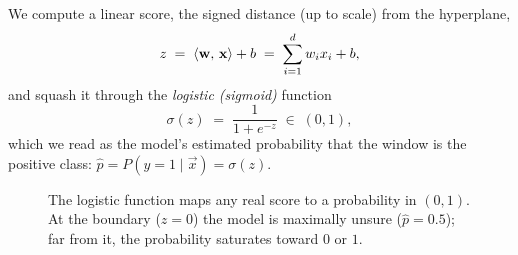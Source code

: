 We compute a linear score, the signed distance (up to scale) from the hyperplane,
\[
  z \;=\; \langle \mathbf{w},\, \mathbf{x} \rangle + b \;=\; \sum_{i=1}^{d} w_i x_i + b,
\]
and squash it through the \emph{logistic (sigmoid)} function
\[
  \sigma(z) \;=\; \frac{1}{1 + e^{-z}} \;\in\; (0,1),
\]
which we read as the model's estimated probability that the window is the positive class:
$\hat{p} = P(y{=}1 \mid \vec{x}) = \sigma(z)$.

\begin{figure}[H]
\centering
{}
\caption{The logistic function maps any real score to a probability in $(0,1)$. At the
boundary ($z=0$) the model is maximally unsure ($\hat{p}=0.5$); far from it, the
probability saturates toward $0$ or $1$.}
\label{ch39:fig-sigmoid}
\end{figure}

